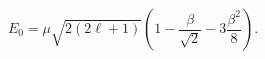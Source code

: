 \begin{equation}                              
E_{0} = \mu \sqrt{2(2 \ell + 1 )} (1 - \frac{\beta}{\sqrt{2}} -                              
3 \frac{\beta^{2}}{8}).       \label{eq:ez}                              
\end{equation} 
